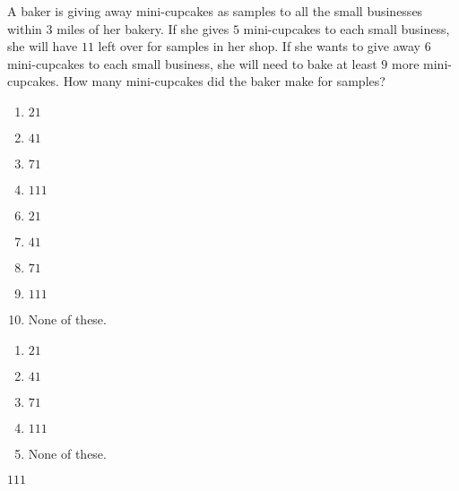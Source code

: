  
A baker is giving away mini-cupcakes as samples to all the small businesses within $3$ miles of her bakery.  If she gives $5$ mini-cupcakes to each small business, she will have $11$ left over for samples in her shop.  If she wants to give away $6$ mini-cupcakes to each small business, she will need to bake at least $9$ more mini-cupcakes.  How many mini-cupcakes did the baker make for samples?


\ifsat
	\begin{enumerate}[label=\Alph*)]
		\item $21 $ 
		\item $41 $ 
		\item $71 $ 
		\item $111 $ %
	\end{enumerate}
\else
\fi

\ifacteven
	\begin{enumerate}[label=\textbf{\Alph*.},itemsep=\fill,align=left]
		\setcounter{enumii}{5}
		\item $21 $ 
		\item $41 $ 
		\item $71 $ 
		\addtocounter{enumii}{1}
		\item $111 $ %
		\item None of these. 
	\end{enumerate}
\else
\fi

\ifactodd
	\begin{enumerate}[label=\textbf{\Alph*.},itemsep=\fill,align=left]
		\item $21 $ 
		\item $41 $ 
		\item $71 $ 
		\item $111 $ %
		\item None of these. 
	\end{enumerate}
\else
\fi

\ifgridin
 $111 $ %

\else
\fi

